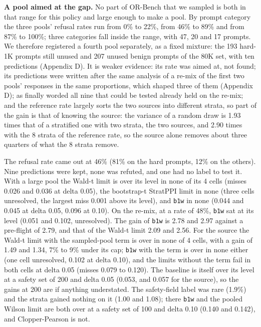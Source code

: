 \documentclass[11pt]{article}
\begin{document}
\textbf{A pool aimed at the gap.} No part of OR-Bench that we sampled is both in that range for this policy and large enough to make a pool. By prompt category the three pools' refusal rates run from 0\% to 22\%, from 46\% to 89\% and from 87\% to 100\%; three categories fall inside the range, with 47, 20 and 17 prompts. We therefore registered a fourth pool separately, as a fixed mixture: the 193 hard-1K prompts still unused and 207 unused benign prompts of the 80K set, with ten predictions (Appendix D). It is weaker evidence: its rate was aimed at, not found; its predictions were written after the same analysis of a re-mix of the first two pools' responses in the same proportions, which shaped three of them (Appendix D); as finally worded all nine that could be tested already held on the re-mix; and the reference rate largely sorts the two sources into different strata, so part of the gain is that of knowing the source: the variance of a random draw is 1.93 times that of a stratified one with two strata, the two sources, and 2.90 times with the 8 strata of the reference rate, so the source alone removes about three quarters of what the 8 strata remove.


The refusal rate came out at 46\% (81\% on the hard prompts, 12\% on the others). Nine predictions were kept, none was refuted, and one had no label to test it. With a large pool the Wald-t limit is over its level in none of its 4 cells (misses 0.026 and 0.036 at delta 0.05), the bootstrap-t StratPPI limit in none (three cells unresolved, the largest miss 0.001 above its level), and \texttt{b1w} in none (0.044 and 0.045 at delta 0.05, 0.096 at 0.10). On the re-mix, at a rate of 48\%, \texttt{b1w} sat at its level (0.051 and 0.102, unresolved). The gain of \texttt{b1w} is 2.78 and 2.97 against a pre-flight of 2.79, and that of the Wald-t limit 2.09 and 2.56. For the source the Wald-t limit with the sampled-pool term is over in none of 4 cells, with a gain of 1.49 and 1.34, 7\% to 9\% under its cap; \texttt{b1w} with the term is over in none either (one cell unresolved, 0.102 at delta 0.10), and the limits without the term fail in both cells at delta 0.05 (misses 0.079 to 0.120). The baseline is itself over its level at a safety set of 200 and delta 0.05 (0.053, and 0.057 for the source), so the gains at 200 are if anything understated. The safety-field label was rare (1.9\%) and the strata gained nothing on it (1.00 and 1.08); there \texttt{b1w} and the pooled Wilson limit are both over at a safety set of 100 and delta 0.10 (0.140 and 0.142), and Clopper-Pearson is not.
\end{document}
